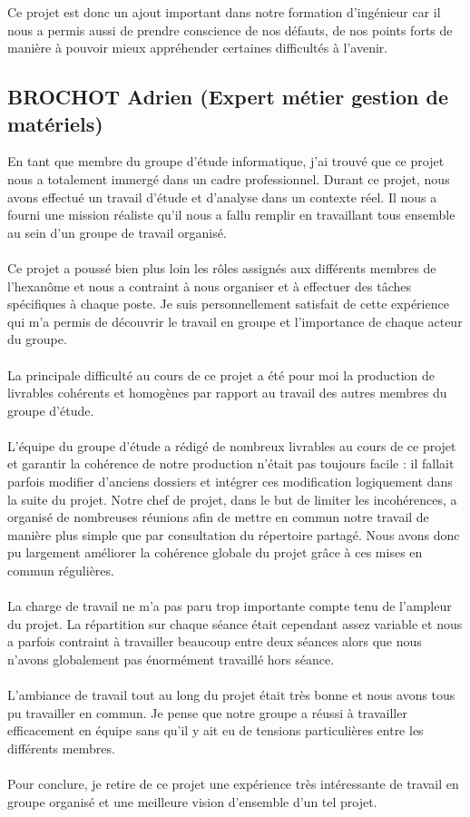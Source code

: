         Ce projet est donc un ajout important dans notre formation d'ingénieur car il nous a permis aussi de prendre conscience de nos défauts, de nos points forts de manière à pouvoir mieux appréhender certaines difficultés à l'avenir. 

    \subsection{BROCHOT Adrien (Expert métier gestion de matériels)}

        En tant que membre du groupe d'étude informatique, j'ai trouvé que ce projet nous a totalement immergé dans un cadre professionnel. Durant ce projet, nous avons effectué un travail d'étude et d'analyse dans un contexte réel. Il nous a fourni une mission réaliste qu'il nous a fallu remplir en travaillant tous ensemble au sein d'un groupe de travail organisé.\\
        \\
        Ce projet a poussé bien plus loin les rôles assignés aux différents membres de l'hexanôme et nous a contraint à nous organiser et à effectuer des tâches spécifiques à chaque poste. Je suis personnellement satisfait de cette expérience qui m'a permis de découvrir le travail en groupe et l'importance de chaque acteur du groupe.\\
        \\
        La principale difficulté au cours de ce projet a été pour moi la production de livrables cohérents et homogènes par rapport au travail des autres membres du groupe d'étude.\\
        \\
        L'équipe du groupe d'étude a rédigé de nombreux livrables au cours de ce projet et garantir la cohérence de notre production n'était pas toujours facile : il fallait parfois modifier d'anciens dossiers et intégrer ces modification logiquement dans la suite du projet. Notre chef de projet, dans le but de limiter les incohérences, a organisé de nombreuses réunions afin de mettre en commun notre travail de manière plus simple que par consultation du répertoire partagé. Nous avons donc pu largement améliorer la cohérence globale du projet grâce à ces mises en commun régulières.\\
        \\
        La charge de travail ne m'a pas paru trop importante compte tenu de l'ampleur du projet. La répartition sur chaque séance était cependant assez variable et nous a parfois contraint à travailler beaucoup entre deux séances alors que nous n'avons globalement pas énormément travaillé hors séance.\\
        \\
        L'ambiance de travail tout au long du projet était très bonne et nous avons tous pu travailler en commun. Je pense que notre groupe a réussi à travailler efficacement en équipe sans qu'il y ait eu de tensions particulières entre les différents membres.\\
        \\
        Pour conclure, je retire de ce projet une expérience très intéressante de travail en groupe organisé et une meilleure vision d'ensemble d'un tel projet.

